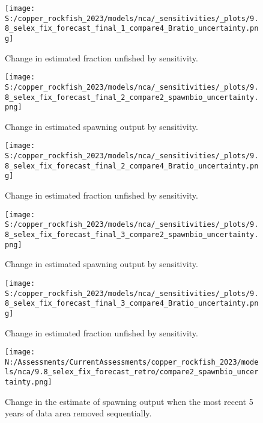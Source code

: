 \documentclass[11pt,
  english,
  letterpaper,
]{article}
\begin{document}
\begin{figure}
\centering
\texttt{[image: S:/copper\_rockfish\_2023/models/nca/\_sensitivities/\_plots/9.8\_selex\_fix\_forecast\_final\_1\_compare4\_Bratio\_uncertainty.png]}
\caption{Change in estimated fraction unfished by sensitivity.\label{fig:sens-depl-1}}
\end{figure}

\newpage

\begin{figure}
\centering
\texttt{[image: S:/copper\_rockfish\_2023/models/nca/\_sensitivities/\_plots/9.8\_selex\_fix\_forecast\_final\_2\_compare2\_spawnbio\_uncertainty.png]}
\caption{Change in estimated spawning output by sensitivity.\label{fig:sens-ssb-2}}
\end{figure}

\newpage

\begin{figure}
\centering
\texttt{[image: S:/copper\_rockfish\_2023/models/nca/\_sensitivities/\_plots/9.8\_selex\_fix\_forecast\_final\_2\_compare4\_Bratio\_uncertainty.png]}
\caption{Change in estimated fraction unfished by sensitivity.\label{fig:sens-depl-2}}
\end{figure}

\newpage

\begin{figure}
\centering
\texttt{[image: S:/copper\_rockfish\_2023/models/nca/\_sensitivities/\_plots/9.8\_selex\_fix\_forecast\_final\_3\_compare2\_spawnbio\_uncertainty.png]}
\caption{Change in estimated spawning output by sensitivity.\label{fig:sens-ssb-3}}
\end{figure}

\newpage

\begin{figure}
\centering
\texttt{[image: S:/copper\_rockfish\_2023/models/nca/\_sensitivities/\_plots/9.8\_selex\_fix\_forecast\_final\_3\_compare4\_Bratio\_uncertainty.png]}
\caption{Change in estimated fraction unfished by sensitivity.\label{fig:sens-depl-3}}
\end{figure}

\newpage

\begin{figure}
\centering
\texttt{[image: N:/Assessments/CurrentAssessments/copper\_rockfish\_2023/models/nca/9.8\_selex\_fix\_forecast\_retro/compare2\_spawnbio\_uncertainty.png]}
\caption{Change in the estimate of spawning output when the most recent 5 years of data area removed sequentially.\label{fig:retro-ssb}}
\end{figure}
\end{document}

